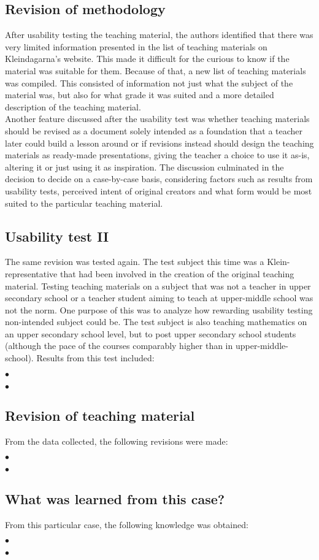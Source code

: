 \subsection{Revision of methodology}
After usability testing the teaching material, the authors identified that there was very limited information presented in the list of teaching materials on Kleindagarna's website. This made it difficult for the curious to know if the material was suitable for them. Because of that, a new list of teaching materials was compiled. This consisted of information not just what the subject of the material was, but also for what grade it was suited and a more detailed description of the teaching material.\\
Another feature discussed after the usability test was whether teaching materials should be revised as a document solely intended as a foundation that a teacher later could build a lesson around or if revisions instead should design the teaching materials as ready-made presentations, giving the teacher a choice to use it as-is, altering it or just using it as inspiration. The discussion culminated in the decision to decide on a case-by-case basis, considering factors such as results from usability tests, perceived intent of original creators and what form would be most suited to the particular teaching material.
\subsection{Usability test II}
The same revision was tested again. The test subject this time was a Klein-representative that had been involved in the creation of the original teaching material. Testing teaching materials on a subject that was not a teacher in upper secondary school or a teacher student aiming to teach at upper-middle school was not the norm. One purpose of this was to analyze how rewarding usability testing non-intended subject could be. The test subject is also teaching mathematics on an upper secondary school level, but to post upper secondary school students (although the pace of the courses comparably higher than in upper-middle-school). Results from this test included:
\begin{description}
    \item $\bullet$
    \item $\bullet$
\end{description}
\subsection{Revision of teaching material}
From the data collected, the following revisions were made:
\begin{description}
    \item $\bullet$
    \item $\bullet$
\end{description}
\subsection{What was learned from this case?}
From this particular case, the following knowledge was obtained:
\begin{description}
    \item $\bullet$
    \item $\bullet$
\end{description}